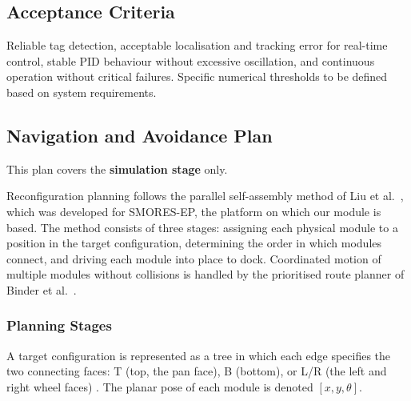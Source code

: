 \documentclass[12pt,a4paper]{article}
\begin{document}
\subsection{Acceptance Criteria}

Reliable tag detection, acceptable localisation and tracking error for real-time control, stable PID behaviour without excessive oscillation, and continuous operation without critical failures. Specific numerical thresholds to be defined based on system requirements.

\subsection{Navigation and Avoidance Plan}
\label{sec:nav-plan}

This plan covers the \textbf{simulation stage} only.

Reconfiguration planning follows the parallel self-assembly method of Liu et al.\ \cite{liu2023}, which was developed for SMORES-EP, the platform on which our module is based. The method consists of three stages: assigning each physical module to a position in the target configuration, determining the order in which modules connect, and driving each module into place to dock. Coordinated motion of multiple modules without collisions is handled by the prioritised route planner of Binder et al.\ \cite{binder2019,binder2017}.

\subsubsection{Planning Stages}

A target configuration is represented as a tree in which each edge specifies the two connecting faces: T (top, the pan face), B (bottom), or L/R (the left and right wheel faces) \cite{liu2017}. The planar pose of each module is denoted $[x, y, \theta]$.
\end{document}
